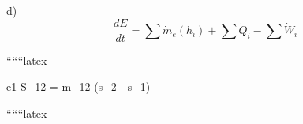 d)
\[
\frac{dE}{dt} = \sum \dot{m}_e (h_i) + \sum \dot{Q}_i - \sum \dot{W}_i
\]

``````latex


e1 \quad \Delta S_{12} = \Delta m_{12} (s_2 - s_1)

``````latex